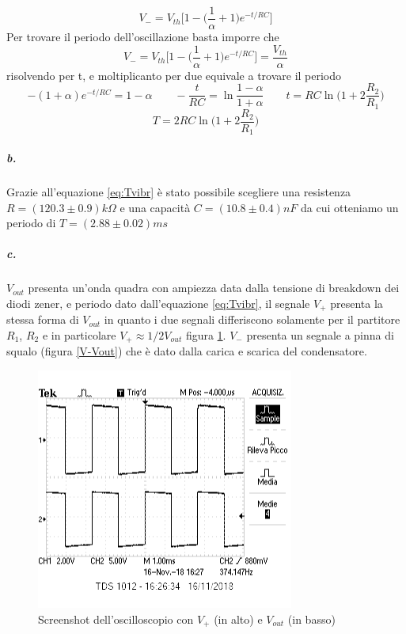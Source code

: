 \documentclass{article}
\begin{document}
		\[
			V_-=V_{th}\bigg[1-\bigg(\frac{1}{\alpha}+1\bigg)e^{-t/RC}\bigg]
		\]		
		Per trovare il periodo dell'oscillazione basta imporre che 
		\[
			V_-=V_{th}\bigg[1-\bigg(\frac{1}{\alpha}+1\bigg)e^{-t/RC}\bigg]=\frac{V_{th}}{\alpha}
		\]
		risolvendo per t, e moltiplicanto per due equivale a trovare il periodo
		\[
			-(1+\alpha)e^{-t/RC}=1-\alpha\qquad -\frac{t}{RC}=\ln\frac{1-\alpha}{1+\alpha}\qquad t=RC\ln\bigg(1+2\frac{R_2}{R_1} \bigg)
		\]
		\begin{equation}
			T=2RC\ln\bigg(1+2\frac{R_2}{R_1} \bigg)
		\label{eq:Tvibr}
		\end{equation}
	\subparagraph{b.}
		Grazie all'equazione \ref{eq:Tvibr} è stato possibile scegliere una resistenza $R=(120.3\pm0.9)k\Omega$ e una capacità $C=(10.8\pm0.4)nF$ da cui otteniamo un periodo di $T=(2.88\pm0.02)ms$
	\subparagraph{c.}
		$V_{out}$ presenta un'onda quadra con ampiezza data dalla tensione di breakdown dei diodi zener, e periodo dato dall'equazione \ref{eq:Tvibr}, il segnale $V_+$ presenta la stessa forma di $V_{out}$ in quanto i due segnali differiscono solamente per il partitore $R_1$, $R_2$ e in particolare $V_+\approx1/2 V_{out}$ figura \ref{V+Vout}. $V_-$ presenta un segnale a pinna di squalo (figura \ref{V-Vout}) che è dato dalla carica e scarica del condensatore.
			
	\begin{figure}
		\centering
		\includegraphics{immagini/V+_Vout.png}
		\caption{Screenshot dell'oscilloscopio con $V_+$ (in alto) e $V_{out}$ (in basso)}
		\label{V+Vout}
	\end{figure}
	
\end{document}
